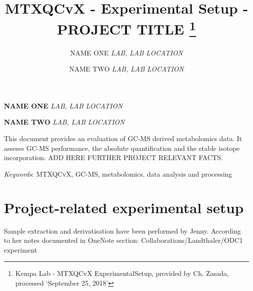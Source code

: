 \documentclass[10pt,]{article}
\title{MTXQCvX - Experimental Setup - PROJECT TITLE \thanks{Kempa Lab - MTXQCvX ExperimentalSetup, provided by Ch. Zasada, processed
`September 25, 2018'}  }
\author{\Large NAME ONE\vspace{0.05in} \newline\normalsize\emph{LAB, LAB LOCATION}   \and \Large NAME TWO\vspace{0.05in} \newline\normalsize\emph{LAB, LAB LOCATION}  }
\date{}
\newcommand*{\authorfont}{\fontfamily{phv}\selectfont}
\renewenvironment{abstract}
 {{%
    \setlength{\leftmargin}{0mm}
    \setlength{\rightmargin}{\leftmargin}%
  }%
  \relax}
 {\endlist}
\begin{document}
	
%

{%
\setlength{\parindent}{0pt}
\thispagestyle{plain}
{\fontsize{18}{20}\selectfont\raggedright 
\maketitle  %

}

{
   \vskip 13.5pt\relax \normalsize\fontsize{11}{12} 
\textbf{\authorfont NAME ONE} \hskip 15pt \emph{\small LAB, LAB LOCATION}   \par \textbf{\authorfont NAME TWO} \hskip 15pt \emph{\small LAB, LAB LOCATION}   

}

}



{
\hypersetup{linkcolor=black}
\setcounter{tocdepth}{2}
\tableofcontents
}




\begin{abstract}

    \hbox{\vrule height .2pt width 39.14pc}

    \vskip 8.5pt %

\noindent This document provides an evaluation of GC-MS derived metabolomics data.
It asseses GC-MS performance, the absolute quantification and the stable
isotope incorporation. ADD HERE FURTHER PROJECT RELEVANT FACTS.


\vskip 8.5pt \noindent \emph{Keywords}: MTXQCvX, GC-MS, metabolomics, data analysis and processing \par

    \hbox{\vrule height .2pt width 39.14pc}



\end{abstract}


\vskip 6.5pt

\noindent  \section{Project-related experimental
setup}\label{project-related-experimental-setup}

Sample extraction and derivatisation have been performed by Jenny.
According to her notes documented in OneNote section:
Collaborations/Landthaler/ODC1 experiment
\end{document}
